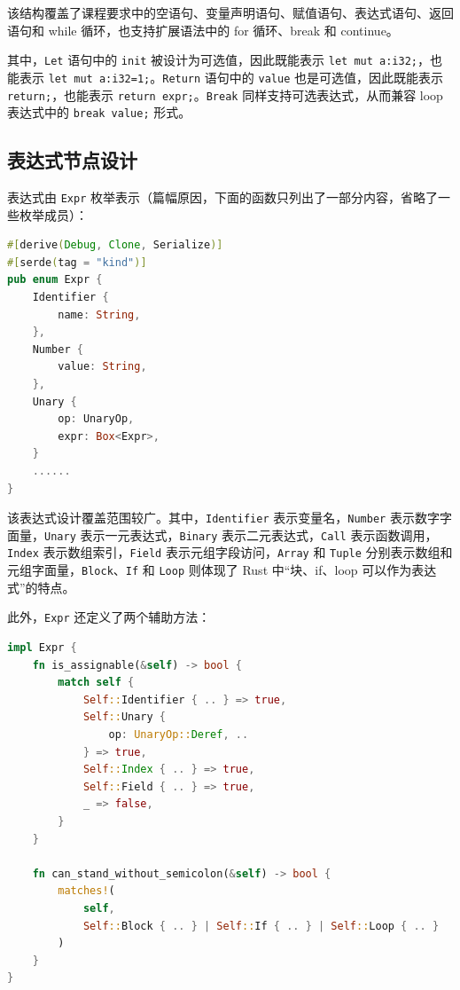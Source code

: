 \documentclass[UTF8,a4paper,12pt]{ctexart}
\begin{document}
该结构覆盖了课程要求中的空语句、变量声明语句、赋值语句、表达式语句、返回语句和 while 循环，也支持扩展语法中的 for 循环、break 和 continue。

其中，\texttt{Let} 语句中的 \texttt{init} 被设计为可选值，因此既能表示 \texttt{let mut a:i32;}，也能表示 \texttt{let mut a:i32=1;}。\texttt{Return} 语句中的 \texttt{value} 也是可选值，因此既能表示 \texttt{return;}，也能表示 \texttt{return expr;}。\texttt{Break} 同样支持可选表达式，从而兼容 loop 表达式中的 \texttt{break value;} 形式。

\subsection{表达式节点设计}

表达式由 \texttt{Expr} 枚举表示（篇幅原因，下面的函数只列出了一部分内容，省略了一些枚举成员）：

\begin{lstlisting}[language=Rust,caption={Expr 节点定义}]
#[derive(Debug, Clone, Serialize)]
#[serde(tag = "kind")]
pub enum Expr {
    Identifier {
        name: String,
    },
    Number {
        value: String,
    },
    Unary {
        op: UnaryOp,
        expr: Box<Expr>,
    }
    ......
}
\end{lstlisting}

该表达式设计覆盖范围较广。其中，\texttt{Identifier} 表示变量名，\texttt{Number} 表示数字字面量，\texttt{Unary} 表示一元表达式，\texttt{Binary} 表示二元表达式，\texttt{Call} 表示函数调用，\texttt{Index} 表示数组索引，\texttt{Field} 表示元组字段访问，\texttt{Array} 和 \texttt{Tuple} 分别表示数组和元组字面量，\texttt{Block}、\texttt{If} 和 \texttt{Loop} 则体现了 Rust 中“块、if、loop 可以作为表达式”的特点。

此外，\texttt{Expr} 还定义了两个辅助方法：

\begin{lstlisting}[language=Rust,caption={表达式辅助判断函数}]
impl Expr {
    fn is_assignable(&self) -> bool {
        match self {
            Self::Identifier { .. } => true,
            Self::Unary {
                op: UnaryOp::Deref, ..
            } => true,
            Self::Index { .. } => true,
            Self::Field { .. } => true,
            _ => false,
        }
    }

    fn can_stand_without_semicolon(&self) -> bool {
        matches!(
            self,
            Self::Block { .. } | Self::If { .. } | Self::Loop { .. }
        )
    }
}
\end{lstlisting}
\end{document}
